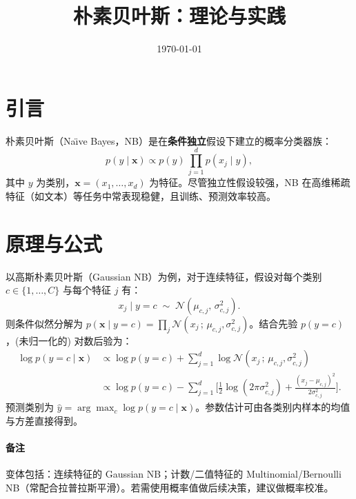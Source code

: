 \documentclass[UTF8,zihao=-4]{ctexart}
\title{朴素贝叶斯：理论与实践}
\author{}
\date{\today}
\begin{document}
\maketitle
\tableofcontents


\section{引言}
朴素贝叶斯（Na\"\i ve Bayes，NB）是在\textbf{条件独立}假设下建立的概率分类器族：
\begin{equation}
 p(y\mid \mathbf{x}) \propto p(y)\,\prod_{j=1}^{d} p(x_j \mid y),
\end{equation}
其中 $y$ 为类别，$\mathbf{x}=(x_1,\dots,x_d)$ 为特征。尽管独立性假设较强，NB 在高维稀疏特征（如文本）等任务中常表现稳健，且训练、预测效率较高。

\section{原理与公式}
以高斯朴素贝叶斯（Gaussian NB）为例，对于连续特征，假设对每个类别 $c\in\{1,\dots,C\}$ 与每个特征 $j$ 有：
\begin{equation}
 x_j \mid y=c \;\sim\; \mathcal{N}(\mu_{c,j},\, \sigma^2_{c,j}).
\end{equation}
则条件似然分解为 $p(\mathbf{x}\mid y=c)=\prod_{j} \mathcal{N}(x_j\,;\,\mu_{c,j},\sigma^2_{c,j})$。结合先验 $p(y=c)$，(未归一化的) 对数后验为：
\begin{align}
 \log p(y=c\mid \mathbf{x}) 
 &\propto \log p(y=c) + \sum_{j=1}^d \log \mathcal{N}(x_j\,;\,\mu_{c,j},\sigma^2_{c,j})\\
 &\propto \log p(y=c) - \sum_{j=1}^d \Big[ \tfrac{1}{2}\log (2\pi\sigma^2_{c,j}) + \tfrac{(x_j-\mu_{c,j})^2}{2\sigma^2_{c,j}} \Big].
\end{align}
预测类别为 $\hat y = \arg\max_c \log p(y=c\mid \mathbf{x})$。参数估计可由各类别内样本的均值与方差直接得到。

\paragraph{备注} 变体包括：连续特征的 Gaussian NB；计数/二值特征的 Multinomial/Bernoulli NB（常配合拉普拉斯平滑）。若需使用概率值做后续决策，建议做概率校准。
\end{document}
